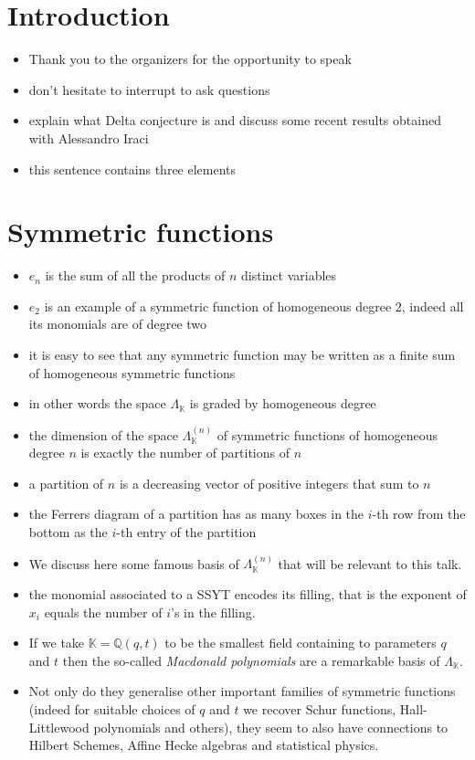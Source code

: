 \documentclass{article}
\newcommand{\KK}{\mathbb{K}}
\newcommand{\QQ}{\mathbb{Q}}
\begin{document}
    \section{Introduction}
    \begin{itemize}
        \item Thank you to the organizers for the opportunity to speak
        \item don't hesitate to interrupt to ask questions
        \item explain what Delta conjecture is and discuss some recent results obtained with Alessandro Iraci 
        \item this sentence contains three elements
    \end{itemize}

    \section{Symmetric functions}
    \begin{itemize}
        \item $e_n$ is the sum of all the products of $n$ distinct variables
        \item $e_2$ is an example of a symmetric function of homogeneous degree $2$, indeed all its monomials are of degree two
        \item it is easy to see that any symmetric function may be written as a finite sum of homogeneous symmetric functions
        \item in other words the space $\Lambda_{\KK}$ is graded by homogeneous degree
        \item the dimension of the space $\Lambda_\KK^{(n)}$ of symmetric functions of homogeneous degree $n$ is exactly the number of partitions of $n$
        \item a partition of $n$ is a decreasing vector of positive integers that sum to $n$
        \item the Ferrers diagram of a partition has as many boxes in the $i$-th row from the bottom as the $i$-th entry of the partition
        \item We discuss here some famous basis of $\Lambda_\KK^{(n)}$ that will be relevant to this talk.
        \item the monomial associated to a SSYT encodes its filling, that is the exponent of $x_i$ equals the number of $i$'s in the filling.
        \item If we take $\KK = \QQ(q,t)$ to be the smallest field containing to parameters $q$ and $t$ then the so-called \emph{Macdonald polynomials} are a remarkable basis of $\Lambda_\KK$. 
        \item Not only do they generalise other important families of symmetric functions (indeed for suitable choices of $q$ and $t$ we recover Schur functions, Hall-Littlewood polynomials and others), they seem to also have connections to Hilbert Schemes, Affine Hecke algebras and statistical physics.
    \end{itemize}
\end{document}
